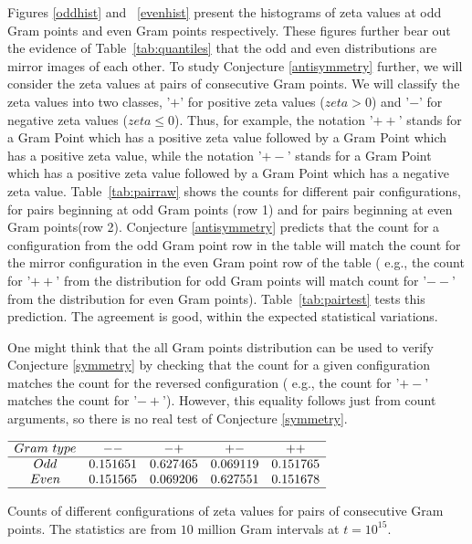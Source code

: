 \documentclass[twoside]{article}
\begin{document}
Figures \ref{oddhist} and ~\ref{evenhist}  present the histograms of zeta values at odd Gram points and even Gram points respectively. These figures further bear out the evidence of Table~\ref{tab:quantiles} that the odd and even distributions are mirror images of each other. To study Conjecture \ref{antisymmetry} further, we will consider the zeta values at pairs of consecutive Gram points. We will classify the zeta values into two classes, '$+$' for positive zeta values ($zeta > 0$) and '$-$' for negative zeta values ($zeta \leqslant  0$). Thus, for example, the notation '$++$' stands for a Gram Point which has a positive zeta value followed by a Gram Point which has a positive zeta value, while the notation '$+-$' stands for a Gram Point which has a positive zeta value followed by a Gram Point which has a negative zeta value. Table~\ref{tab:pairraw} shows the counts for different pair configurations, for pairs beginning at odd Gram points (row 1) and for pairs beginning at even Gram points(row 2). Conjecture \ref{antisymmetry} predicts that the count for a configuration from the odd Gram point row in the table  will match the count for the mirror configuration in the even Gram point row of the table ( e.g., the count for '$++$' from the distribution for odd Gram points will match count for '$--$' from the distribution for even Gram points). Table~\ref{tab:pairtest} tests this prediction. The agreement is good, within the expected statistical variations. 

One might think that the all Gram points distribution can be used to verify Conjecture \ref{symmetry} by checking that the count for a given configuration  matches the count for the reversed configuration ( e.g., the count for '$+-$'  matches the count for '$-+$'). However, this equality follows just from count arguments, so there is no real test of Conjecture \ref{symmetry}.

\begin{table}
\centering \(\begin{array}{ccccc}
\hline
 Gram~type&   --   & -+   & +-   & ++  \\
\hline
Odd & 0.151651&0.627465&0.069119&0.151765 \\
Even & 0.151565&0.069206&0.627551&0.151678 \\
\hline
\end{array}\)
\caption{Counts of different configurations of zeta values for pairs of consecutive Gram points.  The statistics are from $10$ million Gram intervals at $t=10^{15}$.} \label{tab:pairraw}
\end{table}
\end{document}

